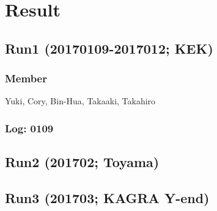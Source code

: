
\chapter{Result} %

\label{Chapter2} %


\section{Run1 (20170109-2017012; KEK)}
\subsection{Member}
Yuki, Cory, Bin-Hua, Takaaki, Takahiro
\subsection{Log: 01\/09}

\section{Run2 (201702; Toyama)}

\section{Run3 (201703; KAGRA Y-end)}

